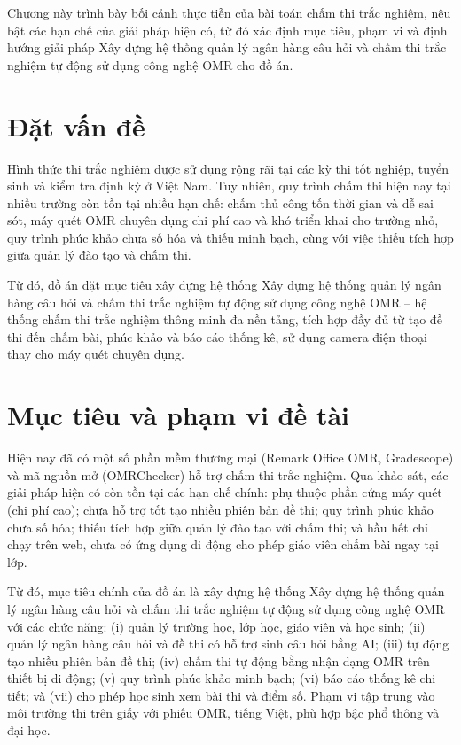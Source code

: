 ﻿\documentclass[../DoAn.tex]{subfiles}
\begin{document}
Chương này trình bày bối cảnh thực tiễn của bài toán chấm thi trắc nghiệm, nêu bật các hạn chế của giải pháp hiện có, từ đó xác định mục tiêu, phạm vi và định hướng giải pháp Xây dựng hệ thống quản lý ngân hàng câu hỏi và chấm thi trắc nghiệm tự động sử dụng công nghệ OMR cho đồ án.

\section{Đặt vấn đề}
\label{section:1.1}

Hình thức thi trắc nghiệm được sử dụng rộng rãi tại các kỳ thi tốt nghiệp, tuyển sinh và kiểm tra định kỳ ở Việt Nam. Tuy nhiên, quy trình chấm thi hiện nay tại nhiều trường còn tồn tại nhiều hạn chế: chấm thủ công tốn thời gian và dễ sai sót, máy quét OMR chuyên dụng chi phí cao và khó triển khai cho trường nhỏ, quy trình phúc khảo chưa số hóa và thiếu minh bạch, cùng với việc thiếu tích hợp giữa quản lý đào tạo và chấm thi.

Từ đó, đồ án đặt mục tiêu xây dựng hệ thống Xây dựng hệ thống quản lý ngân hàng câu hỏi và chấm thi trắc nghiệm tự động sử dụng công nghệ OMR -- hệ thống chấm thi trắc nghiệm thông minh đa nền tảng, tích hợp đầy đủ từ tạo đề thi đến chấm bài, phúc khảo và báo cáo thống kê, sử dụng camera điện thoại thay cho máy quét chuyên dụng.

\section{Mục tiêu và phạm vi đề tài}
\label{section:1.2}

Hiện nay đã có một số phần mềm thương mại (Remark Office OMR, Gradescope) và mã nguồn mở (OMRChecker) hỗ trợ chấm thi trắc nghiệm. Qua khảo sát, các giải pháp hiện có còn tồn tại các hạn chế chính: phụ thuộc phần cứng máy quét (chi phí cao); chưa hỗ trợ tốt tạo nhiều phiên bản đề thi; quy trình phúc khảo chưa số hóa; thiếu tích hợp giữa quản lý đào tạo với chấm thi; và hầu hết chỉ chạy trên web, chưa có ứng dụng di động cho phép giáo viên chấm bài ngay tại lớp.

Từ đó, mục tiêu chính của đồ án là xây dựng hệ thống Xây dựng hệ thống quản lý ngân hàng câu hỏi và chấm thi trắc nghiệm tự động sử dụng công nghệ OMR với các chức năng: (i) quản lý trường học, lớp học, giáo viên và học sinh; (ii) quản lý ngân hàng câu hỏi và đề thi có hỗ trợ sinh câu hỏi bằng AI; (iii) tự động tạo nhiều phiên bản đề thi; (iv) chấm thi tự động bằng nhận dạng OMR trên thiết bị di động; (v) quy trình phúc khảo minh bạch; (vi) báo cáo thống kê chi tiết; và (vii) cho phép học sinh xem bài thi và điểm số. Phạm vi tập trung vào môi trường thi trên giấy với phiếu OMR, tiếng Việt, phù hợp bậc phổ thông và đại học.
\end{document}
